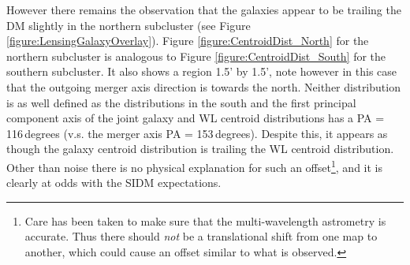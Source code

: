 However there remains the observation that the galaxies appear to be trailing the DM slightly in the northern subcluster (see Figure \ref{figure:LensingGalaxyOverlay}).
Figure \ref{figure:CentroidDist_North} for the northern subcluster is analogous to Figure \ref{figure:CentroidDist_South} for the southern subcluster.
It also shows a region 1.5' by 1.5', note however in this case that the outgoing merger axis direction is towards the north.
Neither distribution is as well defined as the distributions in the south and the first principal component axis of the joint galaxy and WL centroid distributions has a PA = 116\,degrees (v.s. the merger axis PA = 153\,degrees).
Despite this, it appears as though the galaxy centroid distribution is trailing the WL centroid distribution.
Other than noise there is no physical explanation for such an offset\footnote{Care has been taken to make sure that the multi-wavelength astrometry is accurate. Thus there should \textit{not} be a translational shift from one map to another, which could cause an offset similar to what is observed.}, and it is clearly at odds with the SIDM expectations.

